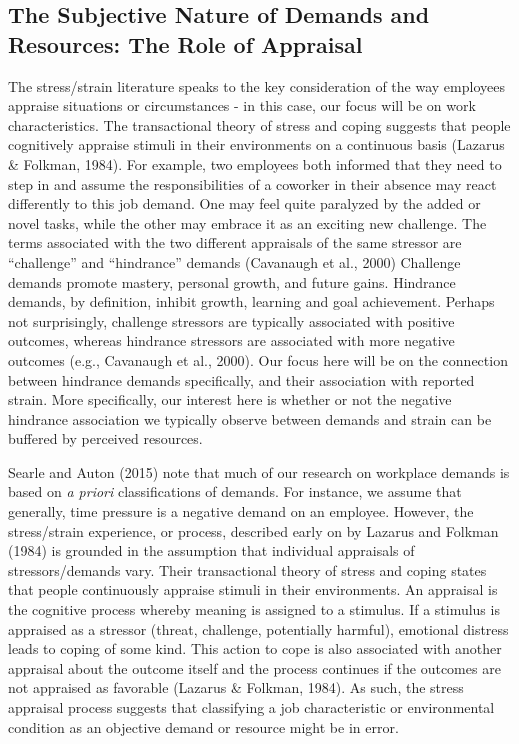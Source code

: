 \documentclass[
  man]{apa6}
\begin{document}
\hypertarget{the-subjective-nature-of-demands-and-resources-the-role-of-appraisal}{%
\subsection{The Subjective Nature of Demands and Resources: The Role of Appraisal}\label{the-subjective-nature-of-demands-and-resources-the-role-of-appraisal}}

The stress/strain literature speaks to the key consideration of the way employees appraise situations or circumstances - in this case, our focus will be on work characteristics. The transactional theory of stress and coping suggests that people cognitively appraise stimuli in their environments on a continuous basis (Lazarus \& Folkman, 1984). For example, two employees both informed that they need to step in and assume the responsibilities of a coworker in their absence may react differently to this job demand. One may feel quite paralyzed by the added or novel tasks, while the other may embrace it as an exciting new challenge. The terms associated with the two different appraisals of the same stressor are ``challenge'' and ``hindrance'' demands (Cavanaugh et al., 2000) Challenge demands promote mastery, personal growth, and future gains. Hindrance demands, by definition, inhibit growth, learning and goal achievement. Perhaps not surprisingly, challenge stressors are typically associated with positive outcomes, whereas hindrance stressors are associated with more negative outcomes (e.g., Cavanaugh et al., 2000). Our focus here will be on the connection between hindrance demands specifically, and their association with reported strain. More specifically, our interest here is whether or not the negative hindrance association we typically observe between demands and strain can be buffered by perceived resources.

Searle and Auton (2015) note that much of our research on workplace demands is based on \emph{a priori} classifications of demands. For instance, we assume that generally, time pressure is a negative demand on an employee. However, the stress/strain experience, or process, described early on by Lazarus and Folkman (1984) is grounded in the assumption that individual appraisals of stressors/demands vary. Their transactional theory of stress and coping states that people continuously appraise stimuli in their environments. An appraisal is the cognitive process whereby meaning is assigned to a stimulus. If a stimulus is appraised as a stressor (threat, challenge, potentially harmful), emotional distress leads to coping of some kind. This action to cope is also associated with another appraisal about the outcome itself and the process continues if the outcomes are not appraised as favorable (Lazarus \& Folkman, 1984). As such, the stress appraisal process suggests that classifying a job characteristic or environmental condition as an objective demand or resource might be in error.
\end{document}
